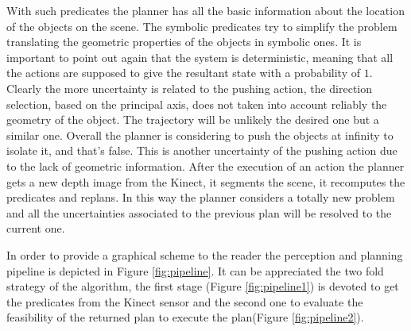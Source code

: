 With such predicates the planner has all the basic information about the location of the objects on the scene. The symbolic predicates try to simplify the problem translating the geometric properties of the objects in symbolic ones. It is important to point out again that the system is deterministic, meaning that all the actions are supposed to give the resultant state with a probability of $1$. Clearly the more uncertainty is related to the pushing action, the direction selection, based on the principal axis, does not taken into account reliably the geometry of the object. The trajectory will be unlikely the desired one but a similar one. Overall the planner is considering to push the objects at infinity to isolate it, and that's false. This is another uncertainty of the pushing action due to the lack of geometric information. 
After the execution of an action the planner gets a new depth image from the Kinect, it segments the scene, it recomputes the predicates and replans. In this way the planner considers a totally new problem and all the uncertainties associated to the previous plan will be resolved to the current one. 

In order to provide a graphical scheme to the reader the perception and planning pipeline is depicted in Figure \ref{fig:pipeline}. It can be appreciated the two fold strategy of the algorithm, the first stage (Figure \ref{fig:pipeline1}) is devoted to get the predicates from the Kinect sensor and the second one to evaluate the feasibility of the returned plan to execute the plan(Figure \ref{fig:pipeline2}).

